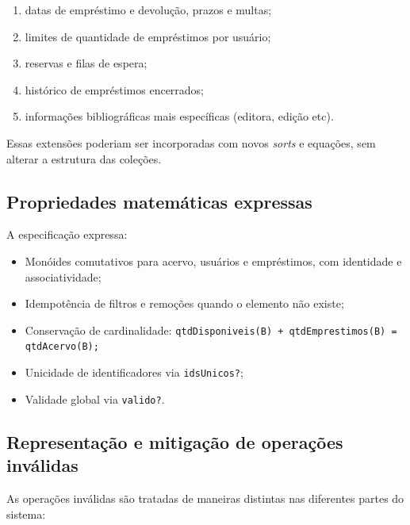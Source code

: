 \documentclass[a4paper,12pt]{article}
\begin{document}
\begin{enumerate}
    \item datas de empréstimo e devolução, prazos e multas;
    \item limites de quantidade de empréstimos por usuário;
    \item reservas e filas de espera;
    \item histórico de empréstimos encerrados;
    \item informações bibliográficas mais específicas (editora, edição etc).
\end{enumerate}

Essas extensões poderiam ser incorporadas com novos \textit{sorts} e equações,
sem alterar a estrutura das coleções.

\subsection{Propriedades matemáticas expressas}

A especificação expressa:

\begin{itemize}
    \item Monóides comutativos para acervo, usuários e empréstimos, com
          identidade e associatividade;

    \item Idempotência de filtros e remoções quando o elemento não existe;
    \item Conservação de cardinalidade:
          \texttt{qtdDisponiveis(\allowbreak{}B) + qtdEmprestimos(\allowbreak{}B) = qtdAcervo(\allowbreak{}B);}

    \item Unicidade de identificadores via \texttt{idsUnicos?};

    \item Validade global via \texttt{valido?}.
\end{itemize}

\subsection{Representação e mitigação de operações inválidas}

As operações inválidas são tratadas de maneiras distintas nas diferentes partes
do sistema:
\end{document}

